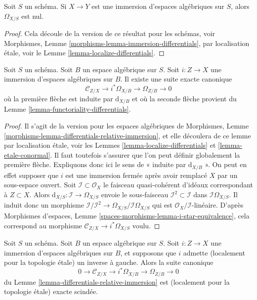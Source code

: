 \begin{lemma}
\label{lemma-immersion-differentials}
Soit $S$ un schéma. Si $X \to Y$ est une immersion
d'espaces algébriques sur $S$, alors $\Omega_{X/S}$ est nul.
\end{lemma}

\begin{proof}
Cela découle de la version de ce résultat pour les schémas, voir
Morphismes, Lemme \ref{morphisms-lemma-immersion-differentials},
par localisation étale, voir le
Lemme \ref{lemma-localize-differentials}.
\end{proof}

\begin{lemma}
\label{lemma-differentials-relative-immersion}
Soit $S$ un schéma. Soit $B$ un espace algébrique sur $S$.
Soit $i : Z \to X$ une immersion d'espaces algébriques sur $B$.
Il existe une suite exacte canonique
$$
\mathcal{C}_{Z/X} \to i^*\Omega_{X/B} \to \Omega_{Z/B} \to 0
$$
où la première flèche est induite par $\text{d}_{X/B}$
et où la seconde flèche provient du
Lemme \ref{lemma-functoriality-differentials}.
\end{lemma}

\begin{proof}
Il s'agit de la version pour les espaces algébriques de
Morphismes, Lemme \ref{morphisms-lemma-differentials-relative-immersion},
et elle découlera de ce lemme par
localisation étale, voir les
Lemmes \ref{lemma-localize-differentials} et
\ref{lemma-etale-conormal}.
Il faut toutefois s'assurer que l'on peut définir globalement la première flèche.
Expliquons donc ici le sens de « induite par $\text{d}_{X/B}$ ».
On peut en effet supposer que $i$ est une immersion fermée après avoir remplacé $X$
par un sous-espace ouvert. Soit $\mathcal{I} \subset \mathcal{O}_X$
le faisceau quasi-cohérent d'idéaux correspondant à $Z \subset X$.
Alors $\text{d}_{X/S} : \mathcal{I} \to \Omega_{X/S}$
envoie le sous-faisceau $\mathcal{I}^2 \subset \mathcal{I}$ dans
$\mathcal{I}\Omega_{X/S}$. Il induit donc un morphisme
$\mathcal{I}/\mathcal{I}^2 \to \Omega_{X/S}/\mathcal{I}\Omega_{X/S}$
qui est $\mathcal{O}_X/\mathcal{I}$-linéaire.
D'après
Morphismes d'espaces, Lemme \ref{spaces-morphisms-lemma-i-star-equivalence},
cela correspond au morphisme $\mathcal{C}_{Z/X} \to i^*\Omega_{X/S}$ voulu.
\end{proof}

\begin{lemma}
\label{lemma-differentials-relative-immersion-section}
Soit $S$ un schéma. Soit $B$ un espace algébrique sur $S$.
Soit $i : Z \to X$ une immersion d'espaces algébriques sur $B$, et
supposons que $i$ admette (localement pour la topologie étale) un inverse à gauche. Alors la
suite canonique
$$
0 \to \mathcal{C}_{Z/X} \to i^*\Omega_{X/B} \to \Omega_{Z/B} \to 0
$$
du
Lemme \ref{lemma-differentials-relative-immersion}
est (localement pour la topologie étale) exacte scindée.
\end{lemma}

